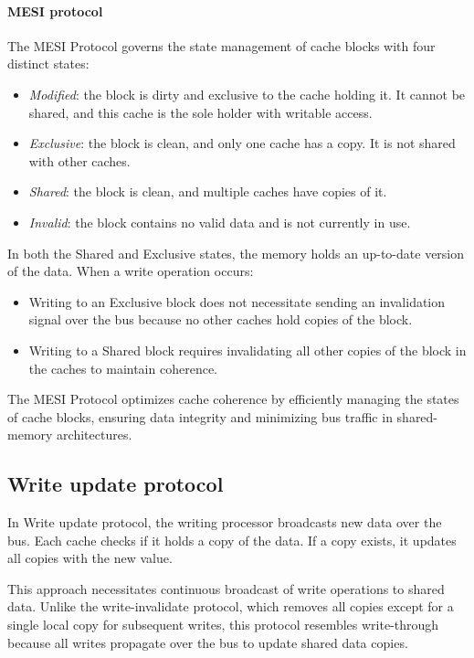 \paragraph*{MESI protocol}
The MESI Protocol governs the state management of cache blocks with four distinct states:
\begin{itemize}
    \item \textit{Modified}: the block is dirty and exclusive to the cache holding it. 
        It cannot be shared, and this cache is the sole holder with writable access.
    \item \textit{Exclusive}: the block is clean, and only one cache has a copy. 
        It is not shared with other caches.
    \item \textit{Shared}: the block is clean, and multiple caches have copies of it.
    \item \textit{Invalid}: the block contains no valid data and is not currently in use.
\end{itemize}
In both the Shared and Exclusive states, the memory holds an up-to-date version of the data.
When a write operation occurs:
\begin{itemize}
    \item Writing to an Exclusive block does not necessitate sending an invalidation signal over the bus because no other caches hold copies of the block.
    \item Writing to a Shared block requires invalidating all other copies of the block in the caches to maintain coherence.
\end{itemize}
The MESI Protocol optimizes cache coherence by efficiently managing the states of cache blocks, ensuring data integrity and minimizing bus traffic in shared-memory architectures.

\subsection{Write update protocol}
In Write update protocol, the writing processor broadcasts new data over the bus. 
Each cache checks if it holds a copy of the data. If a copy exists, it updates all copies with the new value.

This approach necessitates continuous broadcast of write operations to shared data. 
Unlike the write-invalidate protocol, which removes all copies except for a single local copy for subsequent writes, this protocol resembles write-through because all writes propagate over the bus to update shared data copies.

